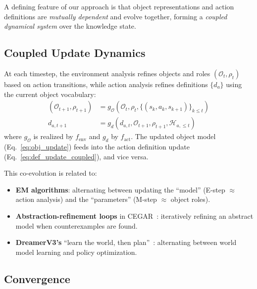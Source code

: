 \documentclass{article}
\newcommand{\calO}{\mathcal{O}}
\newcommand{\calH}{\mathcal{H}}
\begin{document}
A defining feature of our approach is that object representations and action definitions are \emph{mutually dependent} and evolve together, forming a \emph{coupled dynamical system} over the knowledge state.

\subsection{Coupled Update Dynamics}
\label{sec:coupled}

At each timestep, the environment analysis refines objects and roles $(\calO_t, \rho_t)$ based on action transitions, while action analysis refines definitions $\{d_a\}$ using the current object vocabulary:
\begin{align}
(\calO_{t+1}, \rho_{t+1}) &= g_{\calO}(\calO_t, \rho_t, \{(s_k, a_k, s_{k+1})\}_{k \leq t}) \label{eq:obj_update} \\
d_{a, t+1} &= g_d(d_{a,t}, \calO_{t+1}, \rho_{t+1}, \calH_{a, \leq t}) \label{eq:def_update_coupled}
\end{align}
where $g_{\calO}$ is realized by $f_{\text{env}}$ and $g_d$ by $f_{\text{act}}$.  The updated object model (Eq.~\ref{eq:obj_update}) feeds into the action definition update (Eq.~\ref{eq:def_update_coupled}), and vice versa.

This co-evolution is related to:
\begin{itemize}[nosep]
    \item \textbf{EM algorithms}: alternating between updating the ``model'' (E-step $\approx$ action analysis) and the ``parameters'' (M-step $\approx$ object roles).
    \item \textbf{Abstraction-refinement loops} in CEGAR~\cite{clarke2003counterexample}: iteratively refining an abstract model when counterexamples are found.
    \item \textbf{DreamerV3's} ``learn the world, then plan''~\cite{hafner2023dreamerv3}: alternating between world model learning and policy optimization.
\end{itemize}

\subsection{Convergence}
\label{sec:convergence}

\end{document}
